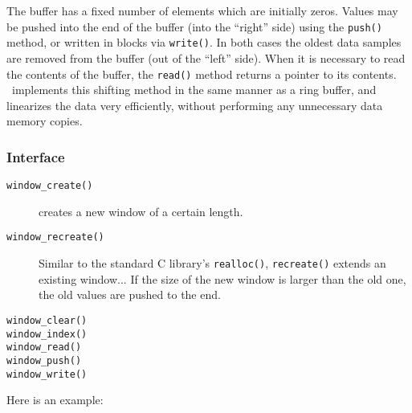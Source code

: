 The buffer has a fixed number of elements which are initially zeros.
Values may be pushed into the end of the buffer (into the ``right'' side)
using the {\tt push()} method, or written in blocks via {\tt write()}.
In both cases the oldest data samples are removed from the buffer (out of the
``left'' side).
When it is necessary to read the contents of the buffer, the {\tt read()}
method returns a pointer to its contents.
\liquid\ implements this shifting method in the same manner as a ring buffer,
and linearizes the data very efficiently, without performing any unnecessary
data memory copies.

\subsubsection{Interface}
\label{module:buffer:window:interface}

\begin{description}
\item[{\tt window\_create()}]
creates a new window of a certain length.

\item[{\tt window\_recreate()}]
Similar to the standard C library's {\tt realloc()}, {\tt recreate()} extends
an existing window...
If the size of the new window is larger than the old one, the old values are
pushed to the end.

\item[{\tt window\_clear()}]
\item[{\tt window\_index()}]
\item[{\tt window\_read()}]
\item[{\tt window\_push()}]
\item[{\tt window\_write()}]
\end{description}

Here is an example:



